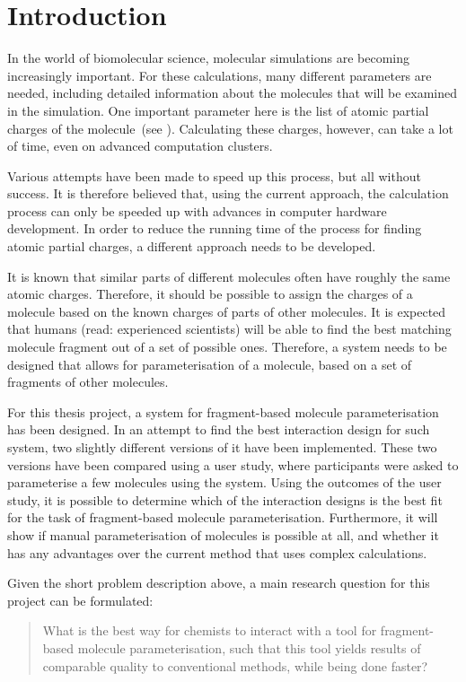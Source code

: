 \chapter{Introduction}

In the world of biomolecular science, molecular simulations are becoming increasingly important. For these calculations, many different parameters are needed, including detailed information about the molecules that will be examined in the simulation. One important parameter here is the list of atomic partial charges of the molecule~(see ). Calculating these charges, however, can take a lot of time, even on advanced computation clusters.

Various attempts have been made to speed up this process, but all without success. It is therefore believed that, using the current approach, the calculation process can only be speeded up with advances in computer hardware development. In order to reduce the running time of the process for finding atomic partial charges, a different approach needs to be developed.

It is known that similar parts of different molecules often have roughly the same atomic charges. Therefore, it should be possible to assign the charges of a molecule based on the known charges of parts of other molecules. It is expected that humans (read: experienced scientists) will be able to find the best matching molecule fragment out of a set of possible ones. Therefore, a system needs to be designed that allows for parameterisation of a molecule, based on a set of fragments of other molecules.

For this thesis project, a system for fragment-based molecule parameterisation has been designed. In an attempt to find the best interaction design for such system, two slightly different versions of it have been implemented. These two versions have been compared using a user study, where participants were asked to parameterise a few molecules using the system. Using the outcomes of the user study, it is possible to determine which of the interaction designs is the best fit for the task of fragment-based molecule parameterisation. Furthermore, it will show if manual parameterisation of molecules is possible at all, and whether it has any advantages over the current method that uses complex calculations.

Given the short problem description above, a main research question for this project can be formulated:
\begin{quote}
What is the best way for chemists to interact with a tool for fragment-based molecule parameterisation, such that this tool yields results of comparable quality to conventional methods, while being done faster?
\end{quote}
\clearpage

